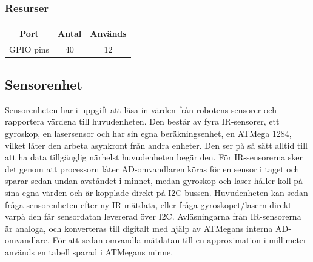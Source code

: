 \documentclass{article}
\begin{document}
\subsubsection{Resurser}

\begin{table}[H]
   \centering
  \begin{tabular}{ | c | c | c | }
    \hline
    \textbf{Port} & \textbf{Antal} & \textbf{Används} \\
    \hline
    GPIO pins & 40 & 12 \\
    \hline
  \end{tabular}
\end{table}

\subsection{Sensorenhet}
Sensorenheten har i uppgift att läsa in värden från robotens sensorer och rapportera värdena till huvudenheten. Den består av fyra IR-sensorer, ett gyroskop, en lasersensor och har sin egna beräkningsenhet, en ATMega 1284, vilket låter den arbeta asynkront från andra enheter. 
\newline\newline
Den ser på så sätt alltid till att ha data tillgänglig närhelst huvudenheten begär den. För IR-sensorerna sker det genom att processorn låter AD-omvandlaren köras för en sensor i taget och sparar sedan undan avståndet i minnet, medan gyroskop och laser håller koll på sina egna värden och är kopplade direkt på I2C-bussen. Huvudenheten kan sedan fråga sensorenheten efter ny IR-mätdata, eller fråga gyroskopet/lasern direkt varpå den får sensordatan levererad över I2C.
\newline\newline
Avläsningarna från IR-sensorerna är analoga, och konverteras till digitalt med hjälp av ATMegans interna AD-omvandlare. För att sedan omvandla mätdatan till en approximation i millimeter används en tabell sparad i ATMegans minne.
\end{document}
